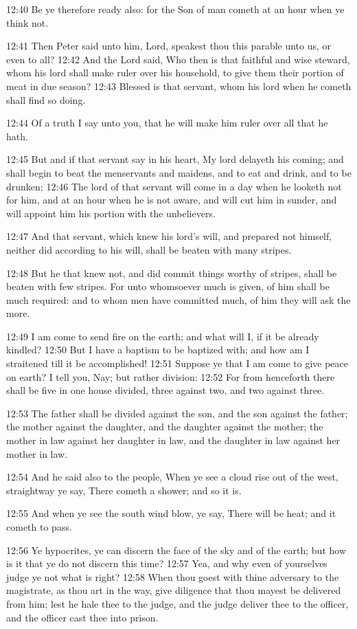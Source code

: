 12:40 Be ye therefore ready also: for the Son of man cometh at an hour when ye think not.

12:41 Then Peter said unto him, Lord, speakest thou this parable unto us, or even to all?  12:42 And the Lord said, Who then is that faithful and wise steward, whom his lord shall make ruler over his household, to give them their portion of meat in due season?  12:43 Blessed is that servant, whom his lord when he cometh shall find so doing.

12:44 Of a truth I say unto you, that he will make him ruler over all that he hath.

12:45 But and if that servant say in his heart, My lord delayeth his coming; and shall begin to beat the menservants and maidens, and to eat and drink, and to be drunken; 12:46 The lord of that servant will come in a day when he looketh not for him, and at an hour when he is not aware, and will cut him in sunder, and will appoint him his portion with the unbelievers.

12:47 And that servant, which knew his lord's will, and prepared not himself, neither did according to his will, shall be beaten with many stripes.

12:48 But he that knew not, and did commit things worthy of stripes, shall be beaten with few stripes. For unto whomsoever much is given, of him shall be much required: and to whom men have committed much, of him they will ask the more.

12:49 I am come to send fire on the earth; and what will I, if it be already kindled?  12:50 But I have a baptism to be baptized with; and how am I straitened till it be accomplished!  12:51 Suppose ye that I am come to give peace on earth? I tell you, Nay; but rather division: 12:52 For from henceforth there shall be five in one house divided, three against two, and two against three.

12:53 The father shall be divided against the son, and the son against the father; the mother against the daughter, and the daughter against the mother; the mother in law against her daughter in law, and the daughter in law against her mother in law.

12:54 And he said also to the people, When ye see a cloud rise out of the west, straightway ye say, There cometh a shower; and so it is.

12:55 And when ye see the south wind blow, ye say, There will be heat; and it cometh to pass.

12:56 Ye hypocrites, ye can discern the face of the sky and of the earth; but how is it that ye do not discern this time?  12:57 Yea, and why even of yourselves judge ye not what is right?  12:58 When thou goest with thine adversary to the magistrate, as thou art in the way, give diligence that thou mayest be delivered from him; lest he hale thee to the judge, and the judge deliver thee to the officer, and the officer cast thee into prison.

